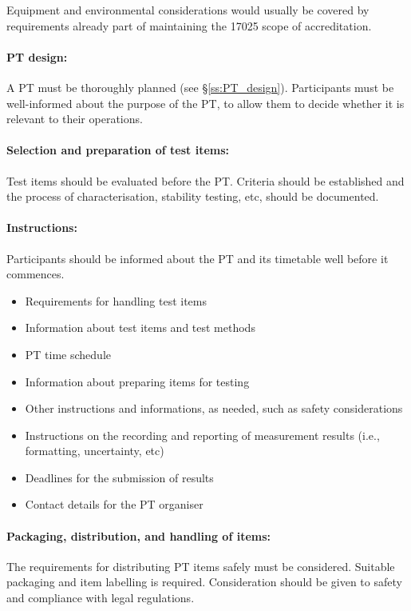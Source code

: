 Equipment and environmental considerations would usually be covered by requirements already part of maintaining the 17025 scope of accreditation.

\paragraph{PT design: }
A PT must be thoroughly planned (see \S\ref{ss:PT_design}). Participants must be well-informed about the purpose of the PT, to allow them to decide whether it is relevant to their operations.

\paragraph{Selection and preparation of test items:}
Test items should be evaluated before the PT. Criteria should be established and the process of characterisation, stability testing, etc, should be documented. 

\paragraph{Instructions:}
Participants should be informed about the PT and its timetable well before it commences. 

\begin{itemize}
	\item Requirements for handling test items
	\item Information about test items and test methods
	\item PT time schedule
	\item Information about preparing items for testing
	\item Other instructions and informations, as needed, such as safety considerations
	\item Instructions on the recording and reporting of measurement results (i.e., formatting, uncertainty, etc)
	\item Deadlines for the submission of results
	\item Contact details for the PT organiser
\end{itemize}

\paragraph{Packaging, distribution, and handling of items:}
The requirements for distributing PT items safely must be considered. Suitable packaging and item labelling is required. Consideration should be given to safety and compliance with legal regulations. 

